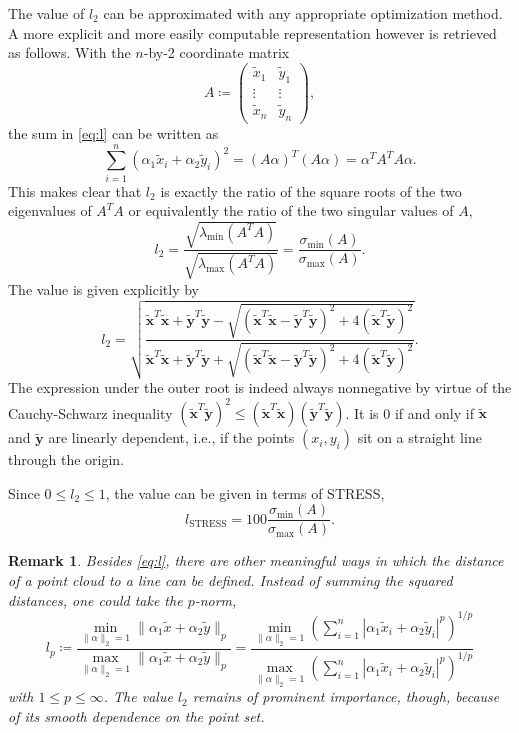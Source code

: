 \documentclass{scrartcl}
\newtheorem*{remark}{Remark}
\theoremstyle{named}
\newcommand\xt{\ensuremath{\bm{\tilde{x}}}}
\newcommand\yt{\ensuremath{\bm{\tilde{y}}}}
\begin{document}
The value of $l_2$ can be approximated with any appropriate optimization method. A more
explicit and more easily computable representation however is retrieved as follows.
With the $n$-by-2 coordinate matrix
\[
  A \coloneqq \begin{pmatrix}
    \tilde{x}_1 & \tilde{y}_1\\
    \vdots & \vdots\\
    \tilde{x}_n & \tilde{y}_n
  \end{pmatrix},
\]
the sum in \eqref{eq:l} can be written as
\[
  \sum_{i=1}^n (\alpha_1 \tilde{x}_i + \alpha_2 \tilde{y}_i)^2
  = (A \alpha)^T (A \alpha)
  = \alpha^T A^T A \alpha.
\]
This makes clear that $l_2$ is exactly the ratio of the square roots of the two
eigenvalues of $A^TA$ or equivalently the ratio of the two singular values of $A$,
\[
l_2
= \frac{
  \sqrt{\lambda_{\min}(A^T A)}
  }{
    \sqrt{\lambda_{\max}(A^T A)}
  }
= \frac{\sigma_{\min}(A)}{\sigma_{\max}(A)}.
\]
The value is given explicitly by
\begin{equation*}
  l_2 = \sqrt{
    \frac{
      \xt^T\xt
      + \yt^T\yt
      - \sqrt{(\xt^T\xt - \yt^T\yt)^2 + 4 (\xt^T\yt)^2}
    }{
      \xt^T\xt
      + \yt^T\yt
      + \sqrt{(\xt^T\xt - \yt^T\yt)^2 + 4 (\xt^T\yt)^2}
    }
    }.
\end{equation*}
The expression under the outer root is indeed always nonnegative by virtue of the
Cauchy-Schwarz inequality $(\xt^T\yt)^2 \le (\xt^T\xt) (\yt^T\yt)$. It is 0 if and only
if $\xt$ and $\yt$ are linearly dependent, i.e., if the points $(x_i, y_i)$ sit on a
straight line through the origin.

Since $0\le l_2\le 1$, the value can be given in terms of STRESS,
\begin{equation}\label{eq:hstress}
  l_\text{STRESS} = 100 \frac{\sigma_{\min}(A)}{\sigma_{\max}(A)}.
\end{equation}



\begin{remark}
Besides \eqref{eq:l}, there are other meaningful ways in which the distance of a point
cloud to a line can be defined. Instead of summing the squared distances, one could take
the $p$-norm,
\[
l_p
  \coloneqq
  \frac{
    \min_{\|\alpha\|_2=1} \|\alpha_1 \tilde{x} + \alpha_2\tilde{y}\|_p
  }{
    \max_{\|\alpha\|_2=1} \|\alpha_1 \tilde{x} + \alpha_2\tilde{y}\|_p
  }
  = \frac{
    \min_{\|\alpha\|_2=1}
  \left(\sum_{i=1}^n |\alpha_1 \tilde{x}_i + \alpha_2 \tilde{y}_i|^p\right)^{1/p}
}{
    \max_{\|\alpha\|_2=1}
  \left(\sum_{i=1}^n |\alpha_1 \tilde{x}_i + \alpha_2 \tilde{y}_i|^p\right)^{1/p}
}
\]
  with $1\le p \le \infty$.
  The value $l_2$ remains of prominent importance, though, because of its smooth
  dependence on the point set.
\end{remark}
\end{document}
